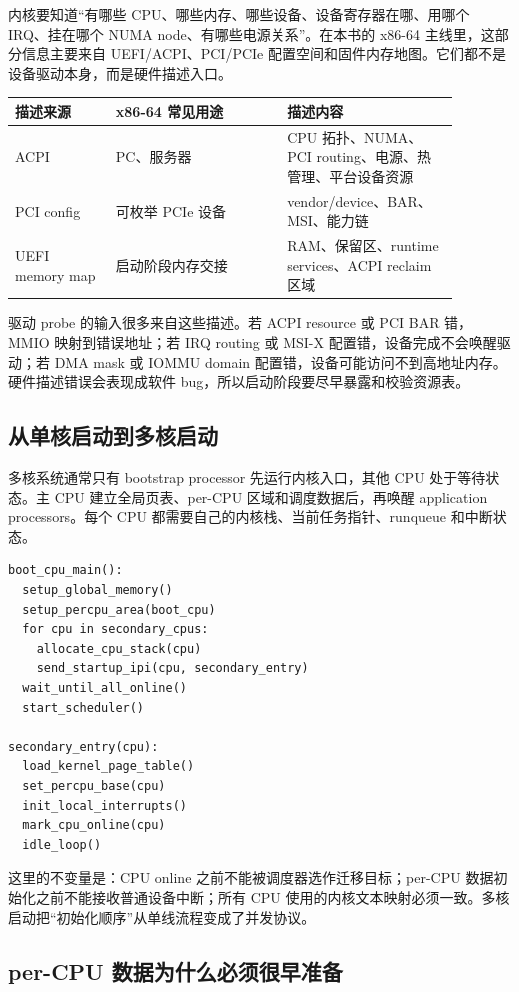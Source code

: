 内核要知道“有哪些 CPU、哪些内存、哪些设备、设备寄存器在哪、用哪个 IRQ、挂在哪个 NUMA node、有哪些电源关系”。在本书的 x86-64 主线里，这部分信息主要来自 UEFI/ACPI、PCI/PCIe 配置空间和固件内存地图。它们都不是设备驱动本身，而是硬件描述入口。

\begin{longtable}{p{0.2\linewidth}p{0.34\linewidth}p{0.34\linewidth}}
\toprule
描述来源 & x86-64 常见用途 & 描述内容 \\
\midrule
ACPI & PC、服务器 & CPU 拓扑、NUMA、PCI routing、电源、热管理、平台设备资源 \\
PCI config & 可枚举 PCIe 设备 & vendor/device、BAR、MSI、能力链 \\
UEFI memory map & 启动阶段内存交接 & RAM、保留区、runtime services、ACPI reclaim 区域 \\
\bottomrule
\end{longtable}

驱动 probe 的输入很多来自这些描述。若 ACPI resource 或 PCI BAR 错，MMIO 映射到错误地址；若 IRQ routing 或 MSI-X 配置错，设备完成不会唤醒驱动；若 DMA mask 或 IOMMU domain 配置错，设备可能访问不到高地址内存。硬件描述错误会表现成软件 bug，所以启动阶段要尽早暴露和校验资源表。

\subsection{从单核启动到多核启动}

多核系统通常只有 bootstrap processor 先运行内核入口，其他 CPU 处于等待状态。主 CPU 建立全局页表、per-CPU 区域和调度数据后，再唤醒 application processors。每个 CPU 都需要自己的内核栈、当前任务指针、runqueue 和中断状态。

\begin{lstlisting}
boot_cpu_main():
  setup_global_memory()
  setup_percpu_area(boot_cpu)
  for cpu in secondary_cpus:
    allocate_cpu_stack(cpu)
    send_startup_ipi(cpu, secondary_entry)
  wait_until_all_online()
  start_scheduler()

secondary_entry(cpu):
  load_kernel_page_table()
  set_percpu_base(cpu)
  init_local_interrupts()
  mark_cpu_online(cpu)
  idle_loop()
\end{lstlisting}

这里的不变量是：CPU online 之前不能被调度器选作迁移目标；per-CPU 数据初始化之前不能接收普通设备中断；所有 CPU 使用的内核文本映射必须一致。多核启动把“初始化顺序”从单线流程变成了并发协议。

\subsection{per-CPU 数据为什么必须很早准备}

